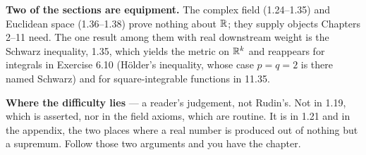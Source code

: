 \begin{roadmap}
\smallskip
\textbf{Two of the sections are equipment.} The complex field (1.24--1.35) and
Euclidean space (1.36--1.38) prove nothing about $\mathbb{R}$; they supply objects
Chapters 2--11 need. The one result among them with real downstream weight is
the Schwarz inequality, 1.35, which yields the metric on $\mathbb{R}^k$ and reappears
for integrals in Exercise 6.10 (H\"older's inequality, whose case $p=q=2$ is
there named Schwarz) and for square-integrable functions in 11.35.

\smallskip
\textbf{Where the difficulty lies} --- a reader's judgement, not Rudin's. Not in
1.19, which is asserted, nor in the field axioms, which are routine. It is in
1.21 and in the appendix, the two places where a real number is produced out of
nothing but a supremum. Follow those two arguments and you have the chapter.
\end{roadmap}

